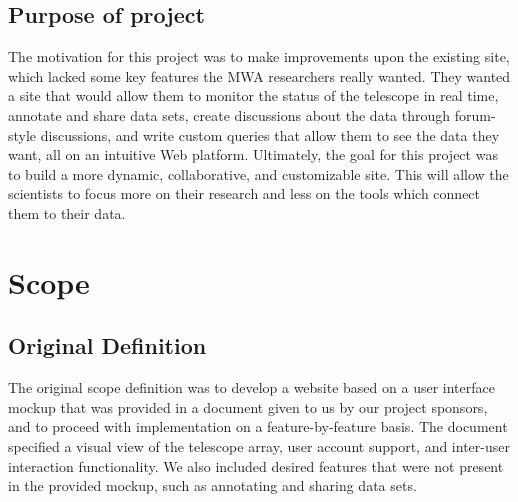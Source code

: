 \documentclass[12pt]{article}
\begin{document}
\begin{spacing}{1.5}
\subsection{Purpose of project}
The motivation for this project was to make improvements upon the existing site, which lacked some key features the MWA researchers really wanted. They wanted a site that would allow them to monitor the status of the telescope in real time, annotate and share data sets, create discussions about the data through forum-style discussions, and write custom queries that allow them to see the data they want, all on an intuitive Web platform. Ultimately, the goal for this project was to build a more dynamic, collaborative, and customizable site. This will allow the scientists to focus more on their research and less on the tools which connect them to their data.

\section{Scope}
\subsection{Original Definition}
The original scope definition was to develop a website based on a user interface mockup that was provided in a document given to us by our project sponsors, and to proceed with implementation on a feature-by-feature basis. The document specified a visual view of the telescope array, user account support, and inter-user interaction functionality. We also included desired features that were not present in the provided mockup, such as annotating and sharing data sets.


\end{spacing}
\end{document}
